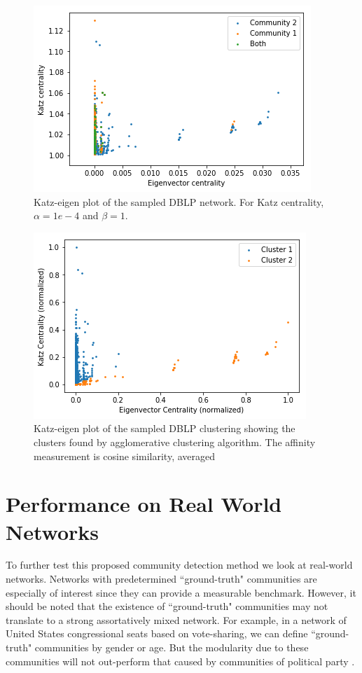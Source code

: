 \documentclass{IEEEtran}
\begin{document}
	\begin{figure}
	\centering
	\includegraphics[width=0.98\linewidth]{dblp_2_kev.png}
	\caption{Katz-eigen plot of the sampled DBLP network. For Katz centrality, $\alpha = 1e-4$ and $\beta = 1$.}
	\label{fig:dblp_pre}
	\end{figure}

	\begin{figure}
	\centering
	\includegraphics[width=0.98\linewidth]{dblp_cluster.png}
	\caption{Katz-eigen plot of the sampled DBLP clustering showing the clusters found by agglomerative clustering algorithm. The affinity measurement is cosine similarity, averaged \textellipsis}
	\label{fig:dblp_cluster}
	\end{figure}

	\section{Performance on Real World Networks}
	\label{s:realWorld}
	To further test this proposed community detection method we look at real-world networks. Networks with predetermined ``ground-truth" communities are especially of interest since they can provide a measurable benchmark. However, it should be noted that the existence of ``ground-truth" communities may not translate to a strong assortatively mixed network. For example, in a network of United States congressional seats based on vote-sharing, we can define ``ground-truth" communities by gender or age. But the modularity due to these communities will not out-perform that caused by communities of political party \cite{congress}.
	
\end{document}
